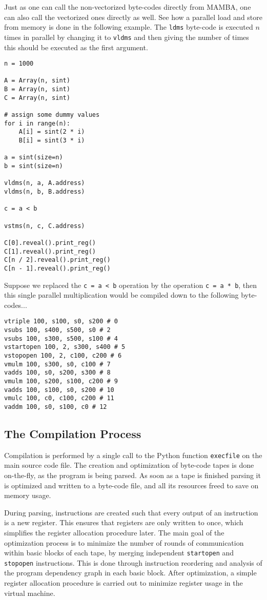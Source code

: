 Just as one can call the non-vectorized byte-codes directly from MAMBA, one
can also call the vectorized ones directly as well. See how a parallel
load and store from memory is done in the following example.
The \verb|ldms| byte-code is executed $n$ times in parallel by
changing it to \verb|vldms| and then giving the number of 
times this should be executed as the first argument.
\begin{lstlisting}
n = 1000

A = Array(n, sint)
B = Array(n, sint)
C = Array(n, sint)

# assign some dummy values
for i in range(n):
    A[i] = sint(2 * i)
    B[i] = sint(3 * i)

a = sint(size=n)
b = sint(size=n)

vldms(n, a, A.address)
vldms(n, b, B.address)

c = a < b

vstms(n, c, C.address)

C[0].reveal().print_reg()
C[1].reveal().print_reg()
C[n / 2].reveal().print_reg()
C[n - 1].reveal().print_reg()
\end{lstlisting}
Suppose we replaced the \verb|c = a < b| operation by the 
operation \verb|c = a * b|, then this single parallel multiplication would
be compiled down to the following byte-codes...
\begin{lstlisting}
vtriple 100, s100, s0, s200 # 0
vsubs 100, s400, s500, s0 # 2
vsubs 100, s300, s500, s100 # 4
vstartopen 100, 2, s300, s400 # 5
vstopopen 100, 2, c100, c200 # 6
vmulm 100, s300, s0, c100 # 7
vadds 100, s0, s200, s300 # 8
vmulm 100, s200, s100, c200 # 9
vadds 100, s100, s0, s200 # 10
vmulc 100, c0, c100, c200 # 11
vaddm 100, s0, s100, c0 # 12
\end{lstlisting}

\subsection{The Compilation Process}
Compilation is performed by a single call to the Python function
\verb|execfile| on the main source code file. The creation and optimization
of byte-code tapes is done on-the-fly, as the program is being parsed. As soon
as a tape is finished parsing it is optimized and written to a byte-code
file, and all its resources freed to save on memory usage.

During parsing, instructions are created such that every output of an
instruction is a new register. This ensures that registers are only written to
once, which simplifies the register allocation procedure later.
The main goal of the optimization process is to minimize the number of rounds
of communication within basic blocks of each tape, by merging independent
\verb|startopen| and \verb|stopopen| instructions. This is done through
instruction reordering and analysis of the program dependency graph in
each basic block. After optimization, a simple register allocation procedure
is carried out to minimize register usage in the virtual machine.

